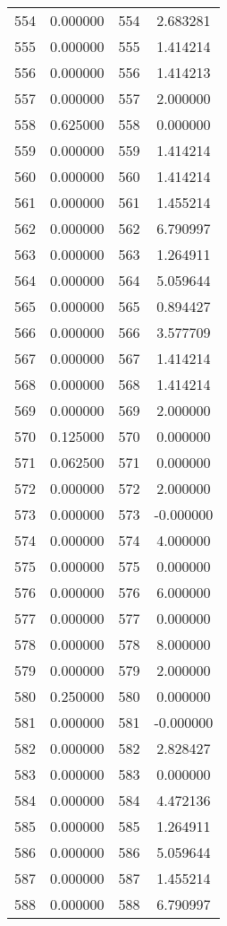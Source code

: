 \documentclass[12pt]{article}
\begin{document}
\begin{longtable}{@{}cccc@{}}
554 & 0.000000 & 554 & 2.683281 \\
555 & 0.000000 & 555 & 1.414214 \\
556 & 0.000000 & 556 & 1.414213 \\
557 & 0.000000 & 557 & 2.000000 \\
558 & 0.625000 & 558 & 0.000000 \\
559 & 0.000000 & 559 & 1.414214 \\
560 & 0.000000 & 560 & 1.414214 \\
561 & 0.000000 & 561 & 1.455214 \\
562 & 0.000000 & 562 & 6.790997 \\
563 & 0.000000 & 563 & 1.264911 \\
564 & 0.000000 & 564 & 5.059644 \\
565 & 0.000000 & 565 & 0.894427 \\
566 & 0.000000 & 566 & 3.577709 \\
567 & 0.000000 & 567 & 1.414214 \\
568 & 0.000000 & 568 & 1.414214 \\
569 & 0.000000 & 569 & 2.000000 \\
570 & 0.125000 & 570 & 0.000000 \\
571 & 0.062500 & 571 & 0.000000 \\
572 & 0.000000 & 572 & 2.000000 \\
573 & 0.000000 & 573 & -0.000000 \\
574 & 0.000000 & 574 & 4.000000 \\
575 & 0.000000 & 575 & 0.000000 \\
576 & 0.000000 & 576 & 6.000000 \\
577 & 0.000000 & 577 & 0.000000 \\
578 & 0.000000 & 578 & 8.000000 \\
579 & 0.000000 & 579 & 2.000000 \\
580 & 0.250000 & 580 & 0.000000 \\
581 & 0.000000 & 581 & -0.000000 \\
582 & 0.000000 & 582 & 2.828427 \\
583 & 0.000000 & 583 & 0.000000 \\
584 & 0.000000 & 584 & 4.472136 \\
585 & 0.000000 & 585 & 1.264911 \\
586 & 0.000000 & 586 & 5.059644 \\
587 & 0.000000 & 587 & 1.455214 \\
588 & 0.000000 & 588 & 6.790997 \\

\end{longtable}
\end{document}
